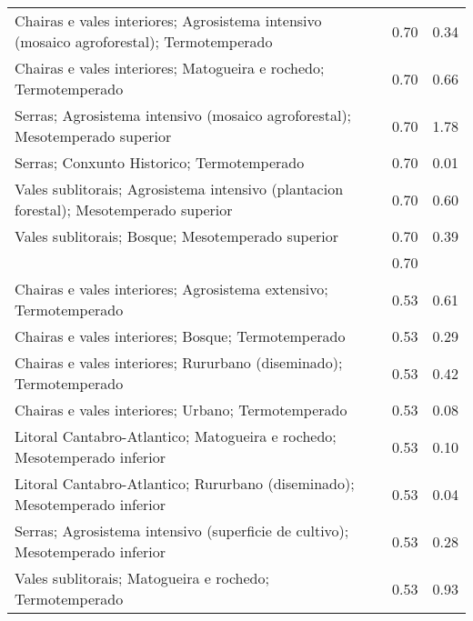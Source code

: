 \begin{table}[p]
\begin{tabular}{lrr}
  Chairas e vales interiores; Agrosistema intensivo (mosaico agroforestal); Termotemperado & 0.70 & 0.34 \\ 
  Chairas e vales interiores; Matogueira e rochedo; Termotemperado & 0.70 & 0.66 \\ 
  Serras; Agrosistema intensivo (mosaico agroforestal); Mesotemperado superior & 0.70 & 1.78 \\ 
  Serras; Conxunto Historico; Termotemperado & 0.70 & 0.01 \\ 
  Vales sublitorais; Agrosistema intensivo (plantacion forestal); Mesotemperado superior & 0.70 & 0.60 \\ 
  Vales sublitorais; Bosque; Mesotemperado superior & 0.70 & 0.39 \\ 
   & 0.70 &  \\ 
  Chairas e vales interiores; Agrosistema extensivo; Termotemperado & 0.53 & 0.61 \\ 
  Chairas e vales interiores; Bosque; Termotemperado & 0.53 & 0.29 \\ 
  Chairas e vales interiores; Rururbano (diseminado); Termotemperado & 0.53 & 0.42 \\ 
  Chairas e vales interiores; Urbano; Termotemperado & 0.53 & 0.08 \\ 
  Litoral Cantabro-Atlantico; Matogueira e rochedo; Mesotemperado inferior & 0.53 & 0.10 \\ 
  Litoral Cantabro-Atlantico; Rururbano (diseminado); Mesotemperado inferior & 0.53 & 0.04 \\ 
  Serras; Agrosistema intensivo (superficie de cultivo); Mesotemperado inferior & 0.53 & 0.28 \\ 
  Vales sublitorais; Matogueira e rochedo; Termotemperado & 0.53 & 0.93 \\ 
   \hline
\end{tabular}
\end{table}
